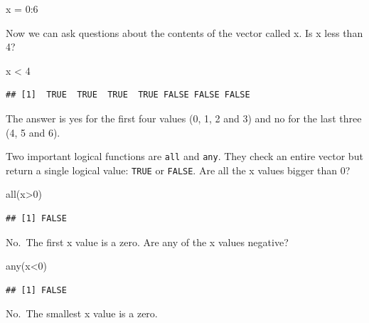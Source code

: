 \documentclass[
]{book}
\newenvironment{Shaded}{\begin{snugshade}}{\end{snugshade}}
\newcommand{\DecValTok}[1]{\textcolor[rgb]{0.00,0.00,0.81}{#1}}
\newcommand{\FunctionTok}[1]{\textcolor[rgb]{0.00,0.00,0.00}{#1}}
\newcommand{\NormalTok}[1]{#1}
\newcommand{\OtherTok}[1]{\textcolor[rgb]{0.56,0.35,0.01}{#1}}
\newcommand{\SpecialCharTok}[1]{\textcolor[rgb]{0.00,0.00,0.00}{#1}}
\begin{document}
\begin{Shaded}
\begin{Highlighting}[]
\NormalTok{x }\OtherTok{=} \DecValTok{0}\SpecialCharTok{:}\DecValTok{6}
\end{Highlighting}
\end{Shaded}

Now we can ask questions about the contents of the vector called x. Is x less than 4?

\begin{Shaded}
\begin{Highlighting}[]
\NormalTok{x }\SpecialCharTok{\textless{}} \DecValTok{4}
\end{Highlighting}
\end{Shaded}

\begin{verbatim}
## [1]  TRUE  TRUE  TRUE  TRUE FALSE FALSE FALSE
\end{verbatim}

The answer is yes for the first four values (0, 1, 2 and 3) and no for the last three (4, 5 and 6).

Two important logical functions are \texttt{all} and \texttt{any}. They check an entire vector but return a single logical value: \texttt{TRUE} or \texttt{FALSE}. Are all the x values bigger than 0?

\begin{Shaded}
\begin{Highlighting}[]
\FunctionTok{all}\NormalTok{(x}\SpecialCharTok{\textgreater{}}\DecValTok{0}\NormalTok{)}
\end{Highlighting}
\end{Shaded}

\begin{verbatim}
## [1] FALSE
\end{verbatim}

No.~The first x value is a zero. Are any of the x values negative?

\begin{Shaded}
\begin{Highlighting}[]
\FunctionTok{any}\NormalTok{(x}\SpecialCharTok{\textless{}}\DecValTok{0}\NormalTok{)}
\end{Highlighting}
\end{Shaded}

\begin{verbatim}
## [1] FALSE
\end{verbatim}

No.~The smallest x value is a zero.
\end{document}
